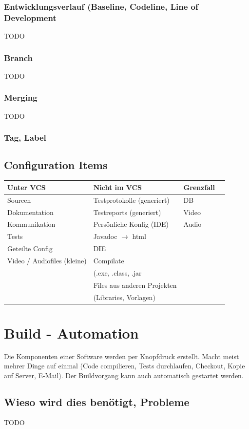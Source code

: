 \documentclass[10pt]{article}
\begin{document}
\subsubsection{Entwicklungsverlauf (Baseline, Codeline, Line of Development}
TODO
\subsubsection{Branch}
TODO
\subsubsection{Merging}
TODO
\subsubsection{Tag, Label}


\subsection{Configuration Items}
\begin{center}
\begin{tabular}{|lll|c} 
\hline
Unter VCS & Nicht im VCS & Grenzfall \\
\hline
Sourcen & Testprotokolle (generiert) & DB \\
Dokumentation & Testreports (generiert) & Video \\ 
Kommunikation & Persönliche Konfig (IDE) & Audio \\
Tests & Javadoc $\rightarrow$ html &  \\
Geteilte Config & DIE & \\
Video / Audiofiles (kleine) & Compilate &\\
& (.exe, .class, .jar & \\
 & Files aus anderen Projekten & \\ 
 & (Libraries, Vorlagen) & \\

\hline
\end{tabular}
\end{center}

\section{Build - Automation}
Die Komponenten einer Software werden per Knopfdruck erstellt. Macht meist mehrer Dinge auf einmal (Code compilieren, Tests durchlaufen, Checkout, Kopie auf Server, E-Mail). Der Buildvorgang kann auch automatisch gestartet werden.
\subsection{Wieso wird dies benötigt, Probleme}
TODO
\end{document}
